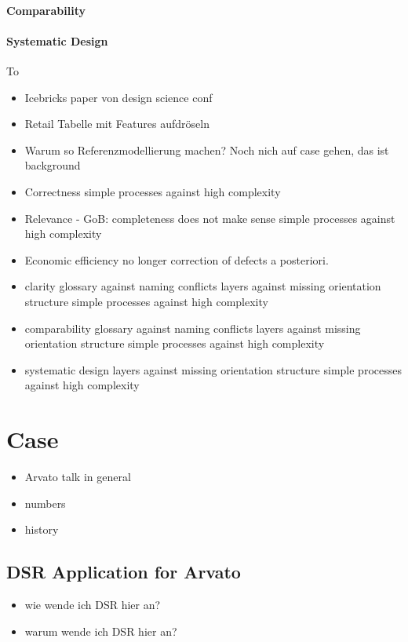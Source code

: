 	 \subsubsection{Comparability}
	 	
	 \subsubsection{Systematic Design}
	 To 
		\begin{itemize}
			\item Icebricks paper von design science conf
			\item Retail Tabelle mit Features aufdröseln 
			\item Warum so Referenzmodellierung machen? Noch nich auf case gehen, das ist background
		\end{itemize}
	
	\begin{itemize}
		\item Correctness
			\subitem simple processes against high complexity
		\item Relevance - GoB: completeness does not make sense
			\subitem simple processes against high complexity
		\item Economic efficiency
		\subitem no longer correction of defects a posteriori. 
		\item clarity
			\subitem glossary against naming conflicts
			 layers against missing orientation structure
			\subitem simple processes against high complexity
		\item comparability 
			\subitem glossary against naming conflicts
			 layers against missing orientation structure
			\subitem simple processes against high complexity
		\item systematic design 
			 layers against missing orientation structure
			\subitem simple processes against high complexity
	\end{itemize}
\chapter{Case}
\begin{itemize}
	\item Arvato talk in general
	\item numbers
	\item history
\end{itemize}
\section{DSR Application for Arvato}
\begin{itemize}
	\item wie wende ich DSR hier an?
	\item warum wende ich DSR hier an?
	
\end{itemize}
